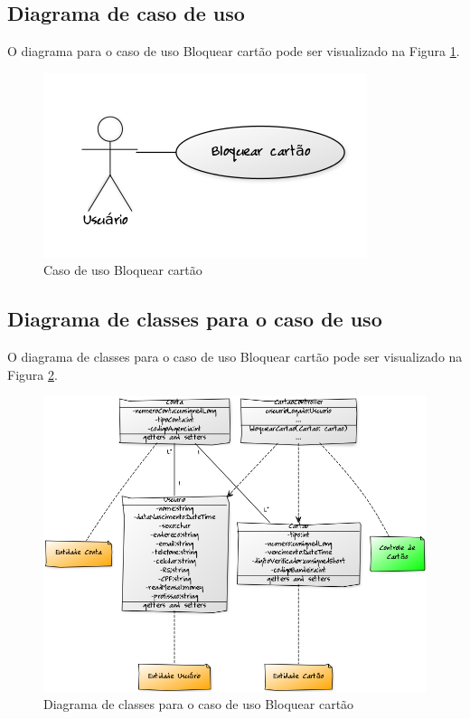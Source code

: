 \subsection{Diagrama de caso de uso}

O diagrama para o caso de uso Bloquear cartão pode ser visualizado na Figura \ref{cdu:bloquearCartao}.

\begin{figure}[!htb]
     \centering
     \includegraphics[scale=0.6]{diagramas/caso-de-uso/imagens/bloquearCartao.png}
     \caption{Caso de uso Bloquear cartão}
     \label{cdu:bloquearCartao}
\end{figure}

\subsection{Diagrama de classes para o caso de uso}

O diagrama de classes para o caso de uso Bloquear cartão pode ser visualizado na Figura \ref{ddc:bloquearCartao}.

\begin{figure}[!htb]
     \centering
     \includegraphics[scale=0.5]{diagramas/diagrama-de-classe/imagens/bloquearCartao.png}
     \caption{Diagrama de classes para o caso de uso Bloquear cartão}
     \label{ddc:bloquearCartao}
\end{figure}

